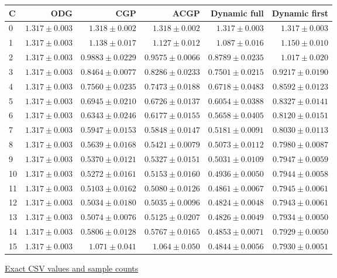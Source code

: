 \begin{center}{\scriptsize\setlength{\tabcolsep}{3pt}
\begin{tabular}{lrrrrr}
\toprule
C & ODG & CGP & ACGP & Dynamic full & Dynamic first \\
\midrule
0 & $1.317\pm0.003$ & $1.318\pm0.002$ & $1.318\pm0.002$ & $1.317\pm0.003$ & $1.317\pm0.003$ \\
1 & $1.317\pm0.003$ & $1.138\pm0.017$ & $1.127\pm0.012$ & $1.087\pm0.016$ & $1.150\pm0.010$ \\
2 & $1.317\pm0.003$ & $0.9883\pm0.0229$ & $0.9575\pm0.0066$ & $0.8789\pm0.0235$ & $1.017\pm0.020$ \\
3 & $1.317\pm0.003$ & $0.8464\pm0.0077$ & $0.8286\pm0.0233$ & $0.7501\pm0.0215$ & $0.9217\pm0.0190$ \\
4 & $1.317\pm0.003$ & $0.7560\pm0.0235$ & $0.7473\pm0.0188$ & $0.6718\pm0.0483$ & $0.8592\pm0.0123$ \\
5 & $1.317\pm0.003$ & $0.6945\pm0.0210$ & $0.6726\pm0.0137$ & $0.6054\pm0.0388$ & $0.8327\pm0.0141$ \\
6 & $1.317\pm0.003$ & $0.6343\pm0.0246$ & $0.6177\pm0.0155$ & $0.5658\pm0.0405$ & $0.8120\pm0.0151$ \\
7 & $1.317\pm0.003$ & $0.5947\pm0.0153$ & $0.5848\pm0.0147$ & $0.5181\pm0.0091$ & $0.8030\pm0.0113$ \\
8 & $1.317\pm0.003$ & $0.5639\pm0.0168$ & $0.5421\pm0.0079$ & $0.5073\pm0.0112$ & $0.7980\pm0.0087$ \\
9 & $1.317\pm0.003$ & $0.5370\pm0.0121$ & $0.5327\pm0.0151$ & $0.5031\pm0.0109$ & $0.7947\pm0.0059$ \\
10 & $1.317\pm0.003$ & $0.5272\pm0.0161$ & $0.5153\pm0.0160$ & $0.4936\pm0.0050$ & $0.7944\pm0.0058$ \\
11 & $1.317\pm0.003$ & $0.5103\pm0.0162$ & $0.5080\pm0.0126$ & $0.4861\pm0.0067$ & $0.7945\pm0.0061$ \\
12 & $1.317\pm0.003$ & $0.5034\pm0.0180$ & $0.5035\pm0.0096$ & $0.4824\pm0.0048$ & $0.7943\pm0.0061$ \\
13 & $1.317\pm0.003$ & $0.5074\pm0.0076$ & $0.5125\pm0.0207$ & $0.4826\pm0.0049$ & $0.7934\pm0.0050$ \\
14 & $1.317\pm0.003$ & $0.5806\pm0.0128$ & $0.5767\pm0.0165$ & $0.4853\pm0.0071$ & $0.7929\pm0.0050$ \\
15 & $1.317\pm0.003$ & $1.071\pm0.041$ & $1.064\pm0.050$ & $0.4844\pm0.0056$ & $0.7930\pm0.0051$ \\
\bottomrule\end{tabular}}
{\footnotesize\href{https://github.com/sanjeevkrishnaa/Compiler-Driven-ACE/blob/codex/ace-scheduler-correctness/docs/latex/qft96_final/data/allocation_torus_dijkstra_m16.csv}{Exact CSV values and sample counts}}
\end{center}
